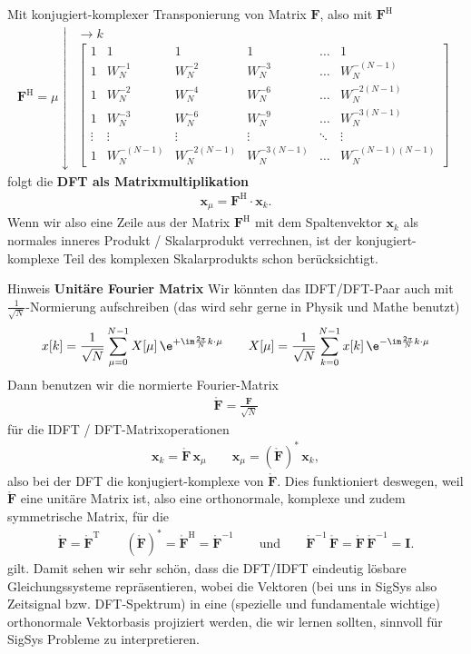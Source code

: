 Mit konjugiert-komplexer Transponierung von Matrix $\bm{F}$, also mit $\bm{F}^\mathrm{H}$
\begin{align}
\label{eq:FourierMatrixH}
\bm{F}^\mathrm{H} =
\mu \downarrow
\substack{\rightarrow k\\
\begin{bmatrix}
1 & 1 & 1 & 1 & \dots & 1\\[1em]
1 & W_N^{-1} & W_N^{-2} & W_N^{-3} & \dots & W_N^{-(N-1)}\\[1em]
1 & W_N^{-2} & W_N^{-4} & W_N^{-6} & \dots & W_N^{-2(N-1)}\\[1em]
1 & W_N^{-3} & W_N^{-6} & W_N^{-9} & \dots & W_N^{-3(N-1)}\\[1em]
\vdots & \vdots & \vdots &\vdots &\ddots & \vdots\\[1em]
1 & W_N^{-(N-1)} & W_N^{-2(N-1)} & W_N^{-3(N-1)} & \dots & W_N^{-(N-1)(N-1)}
\end{bmatrix}
}
\end{align}
folgt die \textbf{DFT als Matrixmultiplikation}
\begin{align}
\label{eq:ex11_dft_hin}
\bm{x}_\mu = \bm{F}^\mathrm{H} \cdot \bm{x}_k.
\end{align}
Wenn wir also eine Zeile aus der Matrix $\bm{F}^\mathrm{H}$ mit dem Spaltenvektor $\bm{x}_k$
als normales inneres Produkt / Skalarprodukt
verrechnen, ist der konjugiert-komplexe Teil des komplexen Skalarprodukts schon
berücksichtigt.

%
\noindent Hinweis \textbf{Unitäre Fourier Matrix}
Wir könnten das IDFT/DFT-Paar auch mit $\frac{1}{\sqrt{N}}$-Normierung
aufschreiben (das wird sehr gerne in Physik und Mathe benutzt)
\begin{align}
x[k] = \frac{1}{\sqrt{N}} \sum_{\mu=0}^{N-1} X[\mu] \, \e^{+\im\frac{2\pi}{N} k \cdot \mu}
\qquad
X[\mu] = \frac{1}{\sqrt{N} }\sum_{k=0}^{N-1} x[k] \, \e^{-\im\frac{2\pi}{N} k \cdot \mu}
\end{align}
Dann benutzen wir die normierte Fourier-Matrix
\begin{align}
\mathring{\bm{F}} = \frac{\bm{F}}{\sqrt{N}}
\end{align}
für die IDFT / DFT-Matrixoperationen
\begin{align}
\bm{x}_k = \mathring{\bm{F}} \, \bm{x}_\mu
\qquad
\bm{x}_\mu = (\mathring{\bm{F}})^* \, \bm{x}_k,
\end{align}
also bei der DFT die konjugiert-komplexe von $\mathring{\mathbf{F}}$.
%
Dies funktioniert deswegen, weil $\mathring{\mathbf{F}}$ eine unitäre Matrix ist,
also eine orthonormale, komplexe und zudem symmetrische Matrix, für die
\begin{align}
\mathring{\bm{F}} = \mathring{\bm{F}}^\mathrm{T}
\qquad
(\mathring{\bm{F}})^* =
\mathring{\bm{F}}^\mathrm{H} =
\mathring{\bm{F}}^{-1}
\qquad\text{und}\qquad
\mathring{\bm{F}}^{-1} \, \mathring{\bm{F}} =
\mathring{\bm{F}} \, \mathring{\bm{F}}^{-1} =
\bm{I}.
\end{align}
gilt.
%
Damit sehen wir sehr schön, dass die DFT/IDFT eindeutig lösbare
Gleichungssysteme repräsentieren, wobei die Vektoren (bei uns in SigSys also Zeitsignal bzw.
DFT-Spektrum) in eine (spezielle und fundamentale wichtige)
orthonormale Vektorbasis projiziert werden, die wir lernen sollten, sinnvoll
für SigSys Probleme zu interpretieren.


